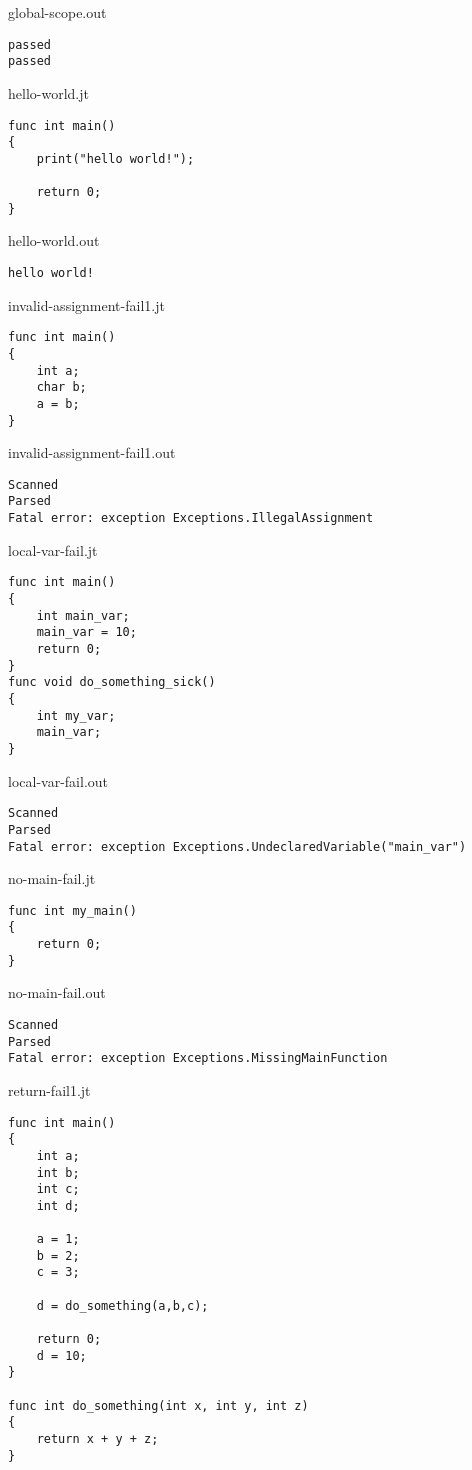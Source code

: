 \documentclass{article}
\begin{document}
global-scope.out
\begin{lstlisting}
passed
passed
\end{lstlisting}

\newpage

hello-world.jt
\begin{lstlisting}
func int main()
{
	print("hello world!");

	return 0;
}
\end{lstlisting}

hello-world.out
\begin{lstlisting}
hello world!
\end{lstlisting}

\newpage


invalid-assignment-fail1.jt
\begin{lstlisting}
func int main()
{
	int a;
	char b;
	a = b;
}
\end{lstlisting}

invalid-assignment-fail1.out
\begin{lstlisting}
Scanned
Parsed
Fatal error: exception Exceptions.IllegalAssignment
\end{lstlisting}

\newpage


local-var-fail.jt
\begin{lstlisting}
func int main()
{
	int main_var;
	main_var = 10;
	return 0;
}
func void do_something_sick()
{
	int my_var;
	main_var;
}
\end{lstlisting}

local-var-fail.out
\begin{lstlisting}
Scanned
Parsed
Fatal error: exception Exceptions.UndeclaredVariable("main_var")
\end{lstlisting}

\newpage

no-main-fail.jt
\begin{lstlisting}
func int my_main()
{
	return 0;
}
\end{lstlisting}

no-main-fail.out
\begin{lstlisting}
Scanned
Parsed
Fatal error: exception Exceptions.MissingMainFunction
\end{lstlisting}

\newpage


return-fail1.jt
\begin{lstlisting}
func int main()
{
	int a;
	int b;
	int c;
	int d;

	a = 1;
	b = 2;
	c = 3;

	d = do_something(a,b,c);

	return 0;
	d = 10;
}

func int do_something(int x, int y, int z)
{
	return x + y + z;
}
\end{lstlisting}
\end{document}
